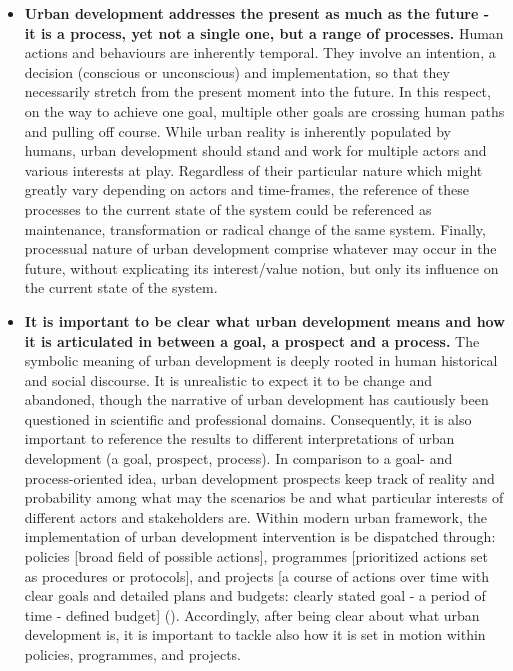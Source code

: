 \documentclass[11pt]{report}
\begin{document}
{\begin{itemize}
\item \textbf{Urban development addresses the present as much as the future - it is a process, yet not a single one, but a range of processes.}
Human actions and behaviours are inherently temporal.
They involve an intention, a decision (conscious or unconscious) and implementation, so that they necessarily stretch from the present moment into the future. In this respect, on the way to achieve one goal, multiple other goals are crossing human paths and pulling off course.
While urban reality is inherently populated by humans, urban development should stand and work for multiple actors and various interests at play.
Regardless of their particular nature which might greatly vary depending on actors and time-frames, the reference of these processes to the current state of the system could be referenced as maintenance, transformation or radical change of the same system.
Finally, processual nature of urban development comprise whatever may occur in the future, without explicating its interest/value notion, but only its influence on the current state of the system.

\item \textbf{It is important to be clear what urban development means and how it is articulated in between a goal, a prospect and a process.}
The symbolic meaning of urban development is deeply rooted in human historical and social discourse. It is unrealistic to expect it to be change and abandoned, though the narrative of urban development has cautiously been questioned in scientific and professional domains. 
Consequently, it is also important to reference the results to different interpretations of urban development (a goal, prospect, process).
In comparison to a goal- and process-oriented idea, urban development prospects keep track of reality and probability among what may the scenarios be and what particular interests of different actors and stakeholders are.
Within modern urban framework, the implementation of urban development intervention is be dispatched through:
policies [broad field of possible actions],
programmes [prioritized actions set as procedures or protocols],
and
projects [a course of actions over time with clear goals and detailed plans and budgets: clearly stated goal - a period of time - defined budget] (\href{Vujosevic}{\citealt{vujosevic_regionalizam_2015}}).
Accordingly, after being clear about what urban development is, it is important to tackle also how it is set in motion within policies, programmes, and projects.


\end{itemize}}
\end{document}
